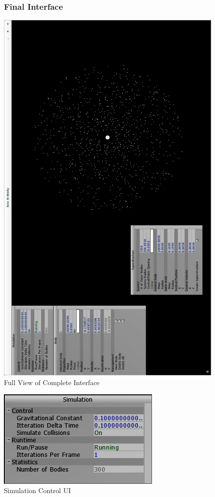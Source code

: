 {\begin{figure}
  \subsubsection{Final Interface}
  \centering
  \includegraphics[width=\textwidth]{../img/finalInterface.png} 
  \caption{Full View of Complete Interface}
\end{figure}
\pagebreak

\begin{figure}[h]
  \centering
  \includegraphics[scale=0.7]{../img/simUI.png} 
  \caption{Simulation Control UI}
\end{figure}

}
